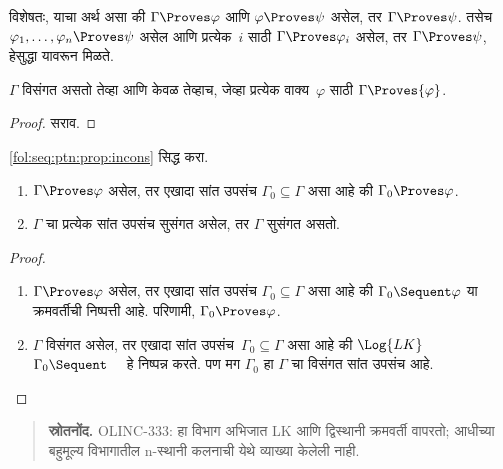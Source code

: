 विशेषतः, याचा अर्थ असा की $\Gamma \Proves \varphi$ आणि $\varphi
\Proves \psi$ असेल, तर $\Gamma \Proves \psi$. तसेच $\varphi_1,
\dots, \varphi_n \Proves \psi$ असेल आणि प्रत्येक~$i$ साठी $\Gamma \Proves \varphi_i$
असेल, तर $\Gamma \Proves \psi$, हेसुद्धा यावरून मिळते.

\begin{prop}
\label{mvl:seq:prf:prop:incons}
$\Gamma$ विसंगत असतो तेव्हा आणि केवळ तेव्हाच, जेव्हा प्रत्येक
  वाक्य~$\varphi$ साठी $\Gamma \Proves {\varphi}$.
\end{prop}

\begin{proof}
सराव.
\end{proof}

\begin{prob}
\ref{fol:seq:ptn:prop:incons} सिद्ध करा.
\end{prob}

\begin{prop}[संहतता]
  \label{mvl:seq:prf:prop:proves-compact}
  \begin{enumerate}
  \item $\Gamma \Proves \varphi$ असेल, तर एखादा सांत उपसंच $\Gamma_0
    \subseteq \Gamma$ असा आहे की $\Gamma_0 \Proves \varphi$.
  \item $\Gamma$ चा प्रत्येक सांत उपसंच सुसंगत असेल, तर $\Gamma$ सुसंगत
    असतो.
  \end{enumerate}
\end{prop}

\begin{proof}
  \begin{enumerate}
    \item $\Gamma \Proves \varphi$ असेल, तर एखादा सांत उपसंच
      $\Gamma_0 \subseteq \Gamma$ असा आहे की $\Gamma_0
      \Sequent \varphi$ या क्रमवर्तीची निष्पत्ती आहे. परिणामी,
      $\Gamma_0 \Proves \varphi$.
    \item $\Gamma$ विसंगत असेल, तर एखादा सांत
      उपसंच~$\Gamma_0 \subseteq \Gamma$ असा आहे की $\Log{LK}$
      $\Gamma_0 \Sequent \quad$ हे निष्पन्न करते. पण मग $\Gamma_0$ हा
      $\Gamma$ चा विसंगत सांत उपसंच आहे.
  \end{enumerate}
\end{proof}



\begin{quote}\small\textbf{स्रोतनोंद.} OLINC-333: हा विभाग अभिजात LK आणि द्विस्थानी क्रमवर्ती वापरतो; आधीच्या बहुमूल्य विभागातील n-स्थानी कलनाची येथे व्याख्या केलेली नाही.\end{quote}










